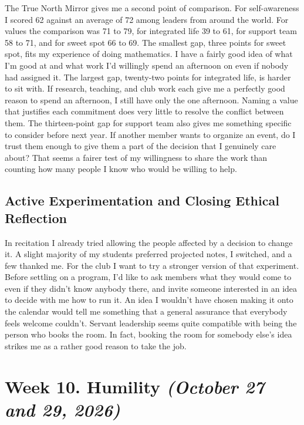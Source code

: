 \documentclass[12pt,letterpaper]{article}
\newcommand{\entry}[1]{\clearpage\section{#1}}
\begin{document}
The True North Mirror gives me a second point of comparison. For self-awareness I scored 62 against an average of 72 among leaders from around the world. For values the comparison was 71 to 79, for integrated life 39 to 61, for support team 58 to 71, and for sweet spot 66 to 69. The smallest gap, three points for sweet spot, fits my experience of doing mathematics. I have a fairly good idea of what I'm good at and what work I'd willingly spend an afternoon on even if nobody had assigned it. The largest gap, twenty-two points for integrated life, is harder to sit with. If research, teaching, and club work each give me a perfectly good reason to spend an afternoon, I still have only the one afternoon. Naming a value that justifies each commitment does very little to resolve the conflict between them. The thirteen-point gap for support team also gives me something specific to consider before next year. If another member wants to organize an event, do I trust them enough to give them a part of the decision that I genuinely care about? That seems a fairer test of my willingness to share the work than counting how many people I know who would be willing to help.

\subsection{Active Experimentation and Closing Ethical Reflection}
In recitation I already tried allowing the people affected by a decision to change it. A slight majority of my students preferred projected notes, I switched, and a few thanked me. For the club I want to try a stronger version of that experiment. Before settling on a program, I'd like to ask members what they would come to even if they didn't know anybody there, and invite someone interested in an idea to decide with me how to run it. An idea I wouldn't have chosen making it onto the calendar would tell me something that a general assurance that everybody feels welcome couldn't. Servant leadership seems quite compatible with being the person who books the room. In fact, booking the room for somebody else's idea strikes me as a rather good reason to take the job.
\entry{Week 10. Humility \textit{(October 27 and 29, 2026)}}
\end{document}
